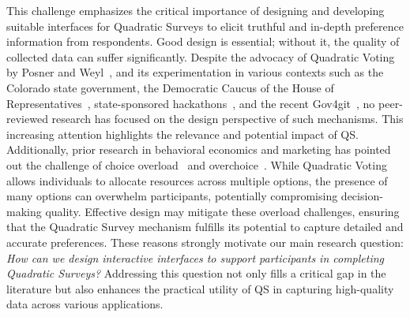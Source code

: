 This challenge emphasizes the critical importance of designing and developing suitable interfaces for Quadratic Surveys to elicit truthful and in-depth preference information from respondents. Good design is essential; without it, the quality of collected data can suffer significantly. Despite the advocacy of Quadratic Voting by Posner and Weyl~\cite{posner2018radical}, and its experimentation in various contexts such as the Colorado state government, the Democratic Caucus of the House of Representatives~\cite{QuadraticVotingColorado}, state-sponsored hackathons~\cite{teamTaiwanDigitalMinister}, and the recent Gov4git~\cite{Gov4gitDecentralizedPlatform2023}, no peer-reviewed research has focused on the design perspective of such mechanisms. This increasing attention highlights the relevance and potential impact of QS. Additionally, prior research in behavioral economics and marketing has pointed out the challenge of choice overload~\cite{iyengarWhenChoiceDemotivating2000} and overchoice~\cite{gourvilleOverchoiceAssortmentType2005}. While Quadratic Voting allows individuals to allocate resources across multiple options, the presence of many options can overwhelm participants, potentially compromising decision-making quality. Effective design may mitigate these overload challenges, ensuring that the Quadratic Survey mechanism fulfills its potential to capture detailed and accurate preferences. These reasons strongly motivate our main research question: \textit{How can we design interactive interfaces to support participants in completing Quadratic Surveys?} Addressing this question not only fills a critical gap in the literature but also enhances the practical utility of QS in capturing high-quality data across various applications.






